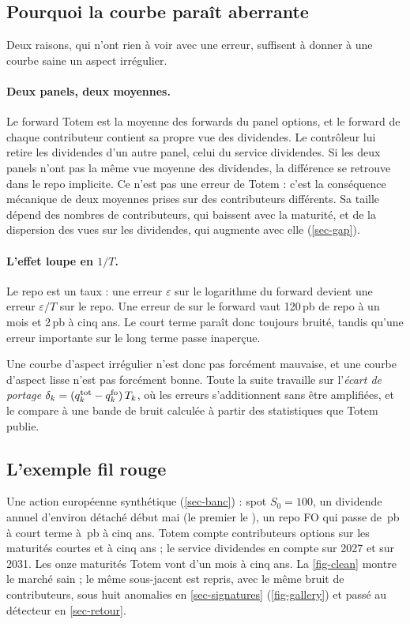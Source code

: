 \subsection{Pourquoi la courbe paraît aberrante}
Deux raisons, qui n'ont rien à voir avec une erreur, suffisent à donner à une courbe saine un aspect irrégulier.

\paragraph{Deux panels, deux moyennes.} Le forward Totem est la moyenne des forwards du panel options, et le forward
de chaque contributeur contient sa propre vue des dividendes. Le contrôleur lui retire les dividendes d'un autre panel,
celui du service dividendes. Si les deux panels n'ont pas la même vue moyenne des dividendes, la différence se
retrouve dans le repo implicite. Ce n'est pas une erreur de Totem : c'est la conséquence mécanique de deux moyennes
prises sur des contributeurs différents. Sa taille dépend des nombres de contributeurs, qui baissent avec la maturité,
et de la dispersion des vues sur les dividendes, qui augmente avec elle (\cref{sec-gap}).

\paragraph{L'effet loupe en $1/T$.} Le repo est un taux : une erreur $\varepsilon$ sur le logarithme du forward devient
une erreur $\varepsilon/T$ sur le repo. Une erreur de  sur le forward vaut \num{120}\,pb de repo à un mois et
\num{2}\,pb à cinq ans. Le court terme paraît donc toujours bruité, tandis qu'une erreur importante sur le long terme
passe inaperçue.

Une courbe d'aspect irrégulier n'est donc pas forcément mauvaise, et une courbe d'aspect lisse n'est pas forcément
bonne. Toute la suite travaille sur l'\emph{écart de portage} $\delta_k=(q^{\mathrm{tot}}_k-q^{\mathrm{fo}}_k)\,T_k$, où les erreurs
s'additionnent sans être amplifiées, et le compare à une bande de bruit calculée à partir des statistiques que Totem
publie.

\subsection{L'exemple fil rouge}\label{sec-filrouge}
\begin{filrouge}
Une action européenne synthétique (\cref{sec-banc}) : spot $S_0=100$, un dividende annuel d'environ \vRunDiv{}
détaché début mai (le premier le \vRunExDate), un repo FO qui passe de \vRunQfoShort\,pb à court terme à
\vRunQfoLong\,pb à cinq ans. Totem compte \vRunNoptShort{} contributeurs options sur les maturités courtes et
\vRunNoptLong{} à cinq ans ; le service dividendes en compte \vRunNdivShort{} sur 2027 et \vRunNdivLong{} sur 2031.
Les onze maturités Totem vont d'un mois à cinq ans. La \cref{fig-clean} montre le marché sain ; le même sous-jacent
est repris, avec le même bruit de contributeurs, sous huit anomalies en \cref{sec-signatures} (\cref{fig-gallery}) et
passé au détecteur en \cref{sec-retour}.
\end{filrouge}

